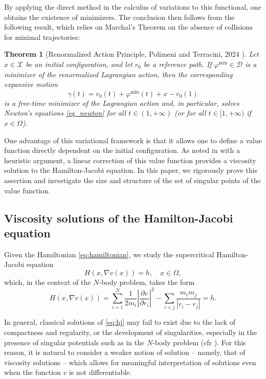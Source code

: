 \documentclass[a4paper,10pt]{amsart}
\theoremstyle{plain}
\newtheorem{thm}{Theorem}
\theoremstyle{definition}
\numberwithin{equation}{section}
\numberwithin{thm}{section}
\begin{document}
By applying the direct method in the calculus of variations to this functional, one obtains the existence of minimizers. The conclusion then follows from the following result, which relies on Marchal's Theorem on the absence of collisions for minimal trajectories:

\begin{thm}[Renormalized Action Principle, Polimeni and Terracini, 2024 \cite{PolimeniTerracini}]\label{th:ren_act_pr}
Let $x \in \mathcal{X}$ be an initial configuration, and let $r_0$ be a reference path. If $\varphi^{\min} \in \mathcal D$ is a minimizer of the renormalized Lagrangian action, then the corresponding expansive motion
\[
    \gamma(t) = r_0(t) + \varphi^{\min}(t) + x - r_0(1)
\]
is a free-time minimizer of the Lagrangian action and, in particular, solves Newton's equations \eqref{eq_newton} for all $t \in (1, +\infty)$ (or for all $t \in [1, +\infty)$ if $x \in \Omega$).
\end{thm}

One advantage of this variational framework is that it allows one to define a value function directly dependent on the initial configuration. As noted in \cite{PolimeniTerracini} with a heuristic argument, a linear correction of this value function provides a viscosity solution to the Hamilton-Jacobi equation. In this paper, we rigorously prove this assertion and investigate the size and structure of the set of singular points of the value function.

\subsection{Viscosity solutions of the Hamilton-Jacobi equation}

Given the Hamiltonian \eqref{eq:hamiltonian}, we study the supercritical Hamilton-Jacobi equation
\begin{equation}\label{eq:hj}
    H(x,  \nabla v(x)) = h, \quad x \in \Omega,
\end{equation}
which, in the context of the $N$-body problem, takes the form
\[
H(x,\nabla v(x)) = \sum_{i=1}^{N}\frac{1}{2 m_i} \left| \frac{\partial v}{\partial r_i} \right|^2 - \sum_{i<j} \frac{m_i m_j}{|r_i - r_j|} = h.
\]

In general, classical solutions of \eqref{eq:hj} may fail to exist due to the lack of compactness and regularity, or the development of singularities, especially in the presence of singular potentials such as in the $N$-body problem (cfr \cite{FatMad2007,Maderna2012}). For this reason, it is natural to consider a weaker notion of solution -- namely, that of viscosity solutions -- which allows for meaningful interpretation of solutions even when the function $v$ is not differentiable.
\end{document}
